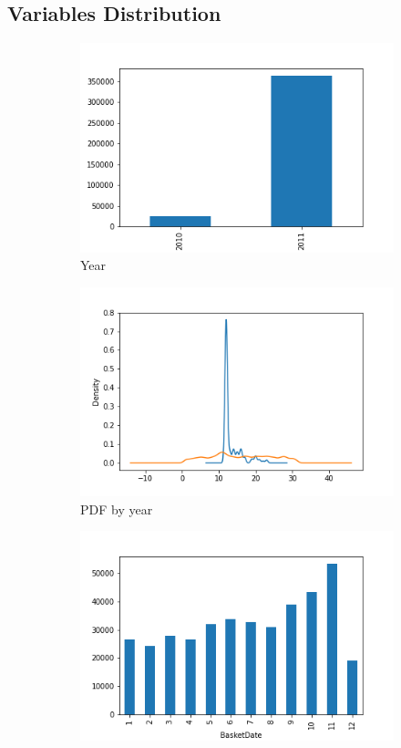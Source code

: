 \subsection{Variables Distribution}
\begin{figure}[!h]
\begin{subfigure}{.49\textwidth}
\centering
\includegraphics[width=.7\textwidth]{img/understanding/year_bar.png}
\caption{Year}
\label{fig:year_bar}
\end{subfigure}
\begin{subfigure}{.49\textwidth}
\centering
\includegraphics[width=.7\textwidth]{img/understanding/year_kde.png}
\caption{PDF by year}
\label{fig:year_kde}
\end{subfigure}
\begin{subfigure}{.33\textwidth}
\centering
\includegraphics[width=.7\textwidth]{img/understanding/month_bar.png}

\end{subfigure}
\end{figure}
